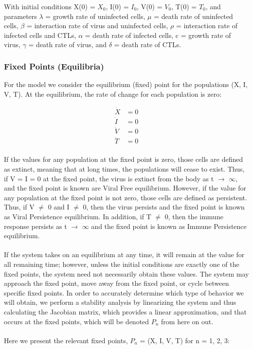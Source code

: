 \documentclass{article}
\begin{document}
With initial conditions X(0) = $X_{0}$, I(0) = $I_{0}$, V(0) = $V_{0}$, T(0) = $T_{0}$, and parameters $\lambda$ = growth rate of uninfected cells, $\mu$ = death rate of uninfected cells, $\beta$ = interaction rate of virus and uninfected cells, $\rho$ = interaction rate of infected cells and CTLs, $\alpha$ = death rate of infected cells, c = growth rate of virus, $\gamma$ = death rate of virus, and $\delta$ = death rate of CTLs.

\subsubsection{Fixed Points (Equilibria)}

For the model we consider the equilibrium (fixed) point for the populations (X, I, V, T). At the equilibrium, the rate of change for each population is zero:

\begin{equation}
	\begin{split}
		\dot X &= 0 \\
		\dot I &= 0 \\
		\dot V &= 0 \\
		\dot T &= 0 \\
	\end{split}
\end{equation}

If the values for any population at the fixed point is zero, those cells are defined as extinct, meaning that at long times, the populations will cease to exist. Thus, if V = I = 0 at the fixed point, the virus is extinct from the body as t $\rightarrow$ $\infty$, and the fixed point is known are Viral Free equilibrium. However, if the value for any population at the fixed point is not zero, those cells are defined as persistent. Thus, if V $\neq$ 0 and I $\neq$ 0, then the virus persists and the fixed point is known as Viral Persistence equilibrium. In addition, if T $\neq$ 0, then the immune response persists as t $\rightarrow$ $\infty$ and the fixed point is known as Immune Persistence equilibrium.\\
\\
If the system takes on an equilibrium at any time, it will remain at the value for all remaining time; however, unless the initial conditions are exactly one of the fixed points, the system need not necessarily obtain these values. The system may approach the fixed point, move away from the fixed point, or cycle between specific fixed points. In order to accurately determine which type of behavior we will obtain, we perform a stability analysis by linearizing the system and thus calculating the Jacobian matrix, which provides a linear approximation, and that occurs at the fixed points, which will be denoted $P_{n}$ from here on out.\\
\\
Here we present the relevant fixed points, $P_{n}$ = (X, I, V, T) for n = 1, 2, 3:
\end{document}
